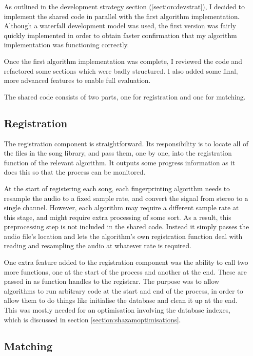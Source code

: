 \documentclass[12pt,a4paper,twoside,openright]{report}
\begin{document}
As outlined in the development strategy section (\ref{section:devstrat}), I decided to implement the shared code in parallel with the first algorithm implementation. Although a waterfall development model was used, the first version was fairly quickly implemented in order to obtain faster confirmation that my algorithm implementation was functioning correctly.

Once the first algorithm implementation was complete, I reviewed the code and refactored some sections which were badly structured. I also added some final, more advanced features to enable full evaluation.



The shared code consists of two parts, one for registration and one for matching. 


\subsection{Registration}

The registration component is straightforward. Its responsibility is to locate all of the files in the song library, and pass them, one by one, into the registration function of the relevant algorithm. It outputs some progress information as it does this so that the process can be monitored.

At the start of registering each song, each fingerprinting algorithm needs to resample the audio to a fixed sample rate, and convert the signal from stereo to a single channel. However, each algorithm may require a different sample rate at this stage, and might require extra processing of some sort. As a result, this preprocessing step is not included in the shared code. Instead it simply passes the audio file's location and lets the algorithm's own registration function deal with reading and resampling the audio at whatever rate is required.

One extra feature added to the registration component was the ability to call two more functions, one at the start of the process and another at the end. These are passed in as function handles to the registrar. The purpose was to allow algorithms to run arbitrary code at the start and end of the process, in order to allow them to do things like initialise the database and clean it up at the end. This was mostly needed for an optimisation involving the database indexes, which is discussed in section \ref{section:shazamoptimisations}.


\subsection{Matching}
\end{document}
